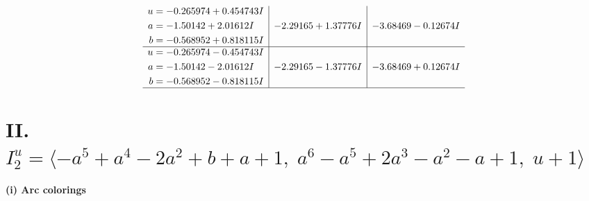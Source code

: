 \documentclass[1p]{elsarticle_modified}
\theoremstyle{definition}
\begin{document}
$$\begin{array}{c|c|c}
\begin{aligned}
u &= -0.265974 + 0.454743 I \\
a &= -1.50142 + 2.01612 I \\
b &= -0.568952 + 0.818115 I\end{aligned}
 & -2.29165 + 1.37776 I & -3.68469 - 0.12674 I \\ \hline\begin{aligned}
u &= -0.265974 - 0.454743 I \\
a &= -1.50142 - 2.01612 I \\
b &= -0.568952 - 0.818115 I\end{aligned}
 & -2.29165 - 1.37776 I & -3.68469 + 0.12674 I\\
 \hline 
 \end{array}$$\newpage\newpage\renewcommand{\arraystretch}{1}
\centering \section*{II. $I^u_{2}= \langle - a^5+a^4-2 a^2+b+a+1,\;a^6- a^5+2 a^3- a^2- a+1,\;u+1 \rangle$}
\flushleft \textbf{(i) Arc colorings}\\
\end{document}
